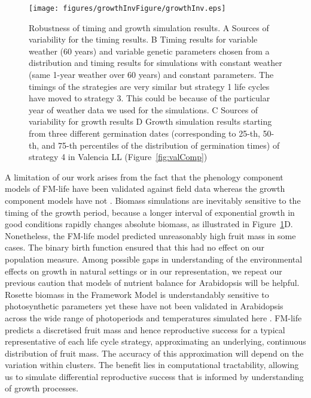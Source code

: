 \begin{figure}[tb]
\centering
\texttt{[image: figures/growthInvFigure/growthInv.eps]}
\caption{Robustness of timing and growth simulation results.  A Sources of
  variability for the timing results. B Timing results for variable weather (60
  years) and variable genetic parameters chosen from a distribution and timing
  results for simulations with constant weather (same 1-year weather over 60
  years) and constant parameters. The timings of the strategies are very similar
  but strategy 1 life cycles have moved to strategy 3. This could be because of
  the particular year of weather data we used for the simulations. C Sources of
  variability for growth results D Growth simulation results starting from three
  different germination dates (corresponding to 25-th, 50-th, and 75-th
  percentiles of the distribution of germination times) of strategy 4 in
  Valencia LL (Figure~\ref{fig:valComp})}
\label{fig:growthInv}
\end{figure}

A limitation of our work arises from the fact that the phenology component
models of FM-life have been validated against field data
\citep{wilczek_effects_2009,burghardt_modeling_2015} whereas the growth
component models have not
\citep{rasse_leaf_2006,christophe_model-based_2008}. Biomass simulations are
inevitably sensitive to the timing of the growth period, because a longer
interval of exponential growth in good conditions rapidly changes absolute
biomass, as illustrated in Figure~\ref{fig:growthInv}D. Nonetheless, the FM-life
model predicted unreasonably high fruit mass in some cases. The binary birth
function ensured that this had no effect on our population measure. Among
possible gaps in understanding of the environmental effects on growth in natural
settings or in our representation, we repeat our previous caution
\citep{chew_multiscale_2014, chew_linking_2017} that models of nutrient balance
for Arabidopsis will be helpful. Rosette biomass in the Framework Model is
understandably sensitive to photosynthetic parameters
\citep{chew_multiscale_2014} yet these have not been validated in Arabidopsis
across the wide range of photoperiods and temperatures simulated here
\citep{walker_temperature_2013}. FM-life predicts a discretised fruit mass and
hence reproductive success for a typical representative of each life cycle
strategy, approximating an underlying, continuous distribution of fruit
mass. The accuracy of this approximation will depend on the variation within
clusters. The benefit lies in computational tractability, allowing us to
simulate differential reproductive success that is informed by understanding of
growth processes.

